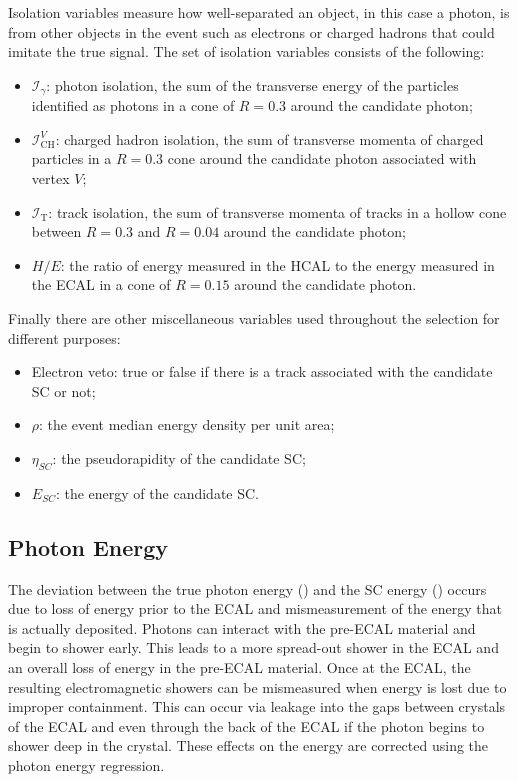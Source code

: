 Isolation variables measure how well-separated an object, in this case a photon, is from other objects in the event such as electrons or charged hadrons that could imitate the true signal. The set of isolation variables consists of the following:
\begin{itemize}[noitemsep]
    \item $\mathcal{I}_{\gamma}$: photon isolation, the sum of the transverse energy of the particles identified as photons in a cone of $R=0.3$ around the candidate photon;
    \item $\mathcal{I}^{V}_{\mathrm{CH}}$: charged hadron isolation, the sum of transverse momenta of charged particles in a $R=0.3$ cone around the candidate photon associated with vertex $V$; 
    \item $\mathcal{I}_{\mathrm{T}}$: track isolation, the sum of transverse momenta of tracks in a hollow cone between $R=0.3$ and $R=0.04$ around the candidate photon;
    \item $H/E$: the ratio of energy measured in the HCAL to the energy measured in the ECAL in a cone of $R=0.15$ around the candidate photon.
\end{itemize}

Finally there are other miscellaneous variables used throughout the selection for different purposes:
\begin{itemize}[noitemsep]
    \item Electron veto: true or false if there is a track associated with the candidate SC or not;
    \item $\rho$: the event median energy density per unit area;
    \item $\eta_{SC}$: the pseudorapidity of the candidate SC;
    \item $E_{SC}$: the energy of the candidate SC.
\end{itemize}



\subsection{Photon Energy} 
The deviation between the true photon energy (\Etrue) and the SC energy (\Eraw) occurs due to loss of energy prior to the ECAL and mismeasurement of the energy that is actually deposited.
Photons can interact with the pre-ECAL material and begin to shower early. This leads to a more spread-out shower in the ECAL and an overall loss of energy in the pre-ECAL material. 
Once at the ECAL, the resulting electromagnetic showers can be mismeasured when energy is lost due to improper containment. 
This can occur via leakage into the gaps between crystals of the ECAL and even through the back of the ECAL if the photon begins to shower deep in the crystal. 
These effects on the energy are corrected using the photon energy regression. 

